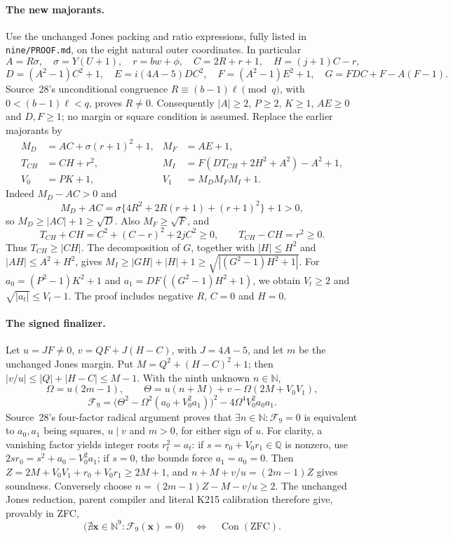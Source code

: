\paragraph{The new majorants.}
Use the unchanged Jones packing and ratio expressions, fully listed in
\texttt{nine/PROOF.md}, on the eight natural outer coordinates.  In
particular
\[
 A=R\sigma,\quad \sigma=Y(U+1),\quad r=bw+\phi,\quad
 C=2R+r+1,\quad H=(j+1)C-r,
\]
\[
 D=(A^2-1)C^2+1,\quad E=i(4A-5)DC^2,\quad
 F=(A^2-1)E^2+1,\quad G=FDC+F-A(F-1).
\]
Source~28's unconditional congruence
$R\equiv(b-1)\ell\pmod q$, with $0<(b-1)\ell<q$, proves $R\ne0$.
Consequently $|A|\ge2$, $P\ge2$, $K\ge1$, $AE\ge0$ and $D,F\ge1$;
no margin or square condition is assumed.  Replace the earlier majorants by
\begin{align*}
 M_D&=AC+\sigma(r+1)^2+1,& M_F&=AE+1,\\
 T_{CH}&=CH+r^2,&
 M_I&=F(DT_{CH}+2H^2+A^2)-A^2+1,\\
 V_0&=PK+1,&V_1&=M_DM_FM_I+1.
\end{align*}
Indeed $M_D-AC>0$ and
\[
 M_D+AC=\sigma\{4R^2+2R(r+1)+(r+1)^2\}+1>0,
\]
so $M_D\ge|AC|+1\ge\sqrt D$.  Also $M_F\ge\sqrt F$, and
\[
 T_{CH}+CH=C^2+(C-r)^2+2jC^2\ge0,
 \qquad T_{CH}-CH=r^2\ge0.
\]
Thus $T_{CH}\ge|CH|$.  The decomposition of $G$, together with
$|H|\le H^2$ and $|AH|\le A^2+H^2$, gives
$M_I\ge|GH|+|H|+1\ge\sqrt{|(G^2-1)H^2+1|}$.
For $a_0=(P^2-1)K^2+1$ and $a_1=DF((G^2-1)H^2+1)$,
we obtain $V_t\ge2$ and $\sqrt{|a_t|}\le V_t-1$.
The proof includes negative $R$, $C=0$ and $H=0$.

\paragraph{The signed finalizer.}
Let $u=JF\ne0$, $v=QF+J(H-C)$, with $J=4A-5$, and let $m$ be the
unchanged Jones margin.  Put $M=Q^2+(H-C)^2+1$; then
$|v/u|\le|Q|+|H-C|\le M-1$.  With the ninth unknown $n\in\mathbb N$,
\[
 \Omega=u(2m-1),\qquad
 \Theta=u(n+M)+v-\Omega(2M+V_0V_1),
\]
\[
 \mathcal F_9=
 \bigl(\Theta^2-\Omega^2(a_0+V_0^2a_1)\bigr)^2
       -4\Omega^4V_0^2a_0a_1.
\]
Source~28's four-factor radical argument proves that
$\exists n\in\mathbb N:\mathcal F_9=0$ is equivalent to
$a_0,a_1$ being squares, $u\mid v$ and $m>0$, for either sign of $u$.
For clarity, a vanishing factor yields integer roots $r_t^2=a_t$:
if $s=r_0+V_0r_1\in\mathbb Q$ is nonzero, use
$2sr_0=s^2+a_0-V_0^2a_1$; if $s=0$, the bounds force $a_1=a_0=0$.
Then $Z=2M+V_0V_1+r_0+V_0r_1\ge2M+1$, and
$n+M+v/u=(2m-1)Z$ gives soundness.  Conversely choose
$n=(2m-1)Z-M-v/u\ge2$.  The unchanged Jones reduction, parent compiler
and literal K215 calibration therefore give, provably in ZFC,
\[
 \bigl(\nexists\mathbf x\in\mathbb N^9:
          \mathcal F_9(\mathbf x)=0\bigr)
 \quad\Longleftrightarrow\quad\operatorname{Con}(\mathrm{ZFC}).
\]

